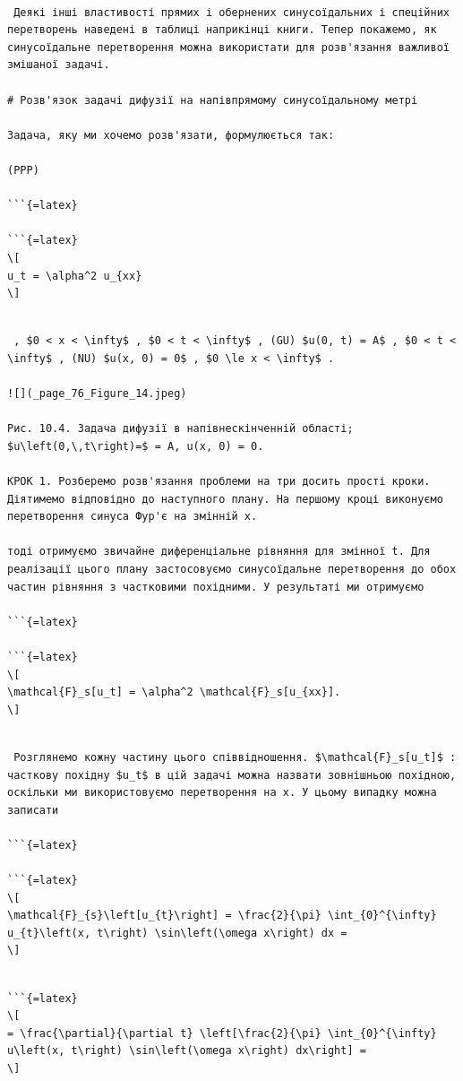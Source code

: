 \documentclass[
  ukrainian,
]{article}
\begin{document}
\begin{verbatim}

 Деякі інші властивості прямих і обернених синусоїдальних і спеційних перетворень наведені в таблиці наприкінці книги. Тепер покажемо, як синусоїдальне перетворення можна використати для розв'язання важливої змішаної задачі.

# Розв'язок задачі дифузії на напівпрямому синусоїдальному метрі

Задача, яку ми хочемо розв'язати, формулюється так:

(PPP)

```{=latex}

```{=latex}
\[
u_t = \alpha^2 u_{xx}
\]
\end{verbatim}

\begin{verbatim}

 , $0 < x < \infty$ , $0 < t < \infty$ , (GU) $u(0, t) = A$ , $0 < t < \infty$ , (NU) $u(x, 0) = 0$ , $0 \le x < \infty$ .

![](_page_76_Figure_14.jpeg)

Рис. 10.4. Задача дифузії в напівнескінченній області; $u\left(0,\,t\right)=$ = A, u(x, 0) = 0.

КРОК 1. Розберемо розв'язання проблеми на три досить прості кроки. Діятимемо відповідно до наступного плану. На першому кроці виконуємо перетворення синуса Фур'є на змінній x.

тоді отримуємо звичайне диференціальне рівняння для змінної t. Для реалізації цього плану застосовуємо синусоїдальне перетворення до обох частин рівняння з частковими похідними. У результаті ми отримуємо

```{=latex}

```{=latex}
\[
\mathcal{F}_s[u_t] = \alpha^2 \mathcal{F}_s[u_{xx}].
\]
\end{verbatim}

\begin{verbatim}

 Розглянемо кожну частину цього співвідношення. $\mathcal{F}_s[u_t]$ : часткову похідну $u_t$ в цій задачі можна назвати зовнішньою похідною, оскільки ми використовуємо перетворення на x. У цьому випадку можна записати

```{=latex}

```{=latex}
\[
\mathcal{F}_{s}\left[u_{t}\right] = \frac{2}{\pi} \int_{0}^{\infty} u_{t}\left(x, t\right) \sin\left(\omega x\right) dx =
\]
\end{verbatim}

\begin{verbatim}

```{=latex}
\[
= \frac{\partial}{\partial t} \left[\frac{2}{\pi} \int_{0}^{\infty} u\left(x, t\right) \sin\left(\omega x\right) dx\right] =
\]
\end{verbatim}
\end{document}
